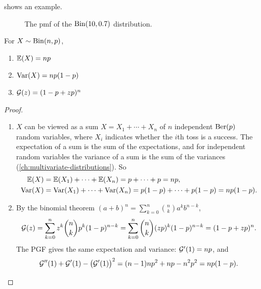  shows an example.

\begin{figure}[H]
\centering
{}
\caption{The pmf of the $\mathrm{Bin}(10, 0.7)$ distribution.}
\label{fig:binomial-pmf}
\end{figure}


\begin{theorem}\label{thm:binomial-properties}
For $X \sim \mathrm{Bin}(n, p)$,
\begin{enumerate}
  \item $\operatorname{\mathbb{E}}(X) = np$
  \item $\operatorname{Var}(X) = np(1-p)$
  \item $\mathcal{G}(z) = (1 - p + zp)^n$
\end{enumerate}
\end{theorem}

\begin{proof}\leavevmode
\begin{enumerate}[leftmargin=2.6em]
  \item[1--2.] $X$ can be viewed as a sum $X = X_1 + \cdots + X_n$ of $n$ independent $\mathrm{Ber}(p)$ random variables, where $X_i$ indicates whether the $i$th toss is a success. The expectation of a sum is the sum of the expectations, and for independent random variables the variance of a sum is the sum of the variances (\cref{ch:multivariate-distributions}). So
  \begin{align*}
    \operatorname{\mathbb{E}}(X) &= \operatorname{\mathbb{E}}(X_1) + \cdots + \operatorname{\mathbb{E}}(X_n) = p + \cdots + p = np, \\
    \operatorname{Var}(X) &= \operatorname{Var}(X_1) + \cdots + \operatorname{Var}(X_n) = p(1-p) + \cdots + p(1-p) = np(1-p).
  \end{align*}
  \item[3.] By the binomial theorem $(a + b)^n = \sum_{k=0}^n \binom{n}{k} a^k b^{n-k}$,
  \[
    \mathcal{G}(z) = \sum_{k=0}^n z^k \binom{n}{k} p^k (1-p)^{n-k} = \sum_{k=0}^n \binom{n}{k} (zp)^k (1-p)^{n-k} = (1 - p + zp)^n.
  \]
  The PGF gives the same expectation and variance: $\mathcal{G}'(1) = np$, and
  \[
    \mathcal{G}''(1) + \mathcal{G}'(1) - \bigl(\mathcal{G}'(1)\bigr)^2 = (n-1)np^2 + np - n^2p^2 = np(1-p). \qedhere
  \]
\end{enumerate}
\end{proof}

